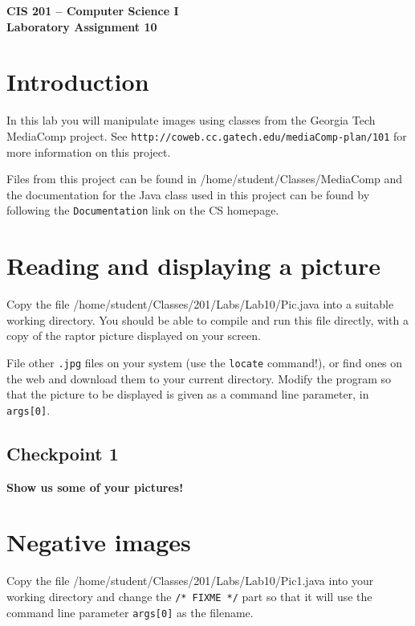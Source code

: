\documentclass[12pt]{article}
\newenvironment{qv}%
  {\quote
   \verbatim}%
  {\endverbatim
   \endquote}
\begin{document}
\sloppypar

\begin{center}
\Large\bf
CIS 201 -- Computer Science I\\
Laboratory Assignment 10\\
\end{center}

\section*{Introduction}
In this lab you will manipulate images using classes
from the Georgia Tech MediaComp project.
See \verb'http://coweb.cc.gatech.edu/mediaComp-plan/101'
for more information on this project.

Files from this project can be found in
\begin{qv}
/home/student/Classes/MediaComp
\end{qv}
and the documentation for the Java class used in this project can be found
by following the \verb'Documentation' link on the CS homepage.

\section*{Reading and displaying a picture}
Copy the file
\begin{qv}
/home/student/Classes/201/Labs/Lab10/Pic.java
\end{qv}
into a suitable working directory.
You should be able to compile and run this file directly,
with a copy of the raptor picture displayed on your screen.

File other \verb'.jpg' files on your system
(use the \verb'locate' command!),
or find ones on the web and download them to your current directory.
Modify the program so that the picture to be displayed
is given as a command line parameter, in \verb'args[0]'.

\subsection*{Checkpoint 1}
{\bf
Show us some of your pictures!
}

\section*{Negative images}
Copy the file
\begin{qv}
/home/student/Classes/201/Labs/Lab10/Pic1.java
\end{qv}
into your working directory
and change the \verb'/* FIXME */' part
so that it will use the command line parameter \verb'args[0]'
as the filename.
\end{document}
